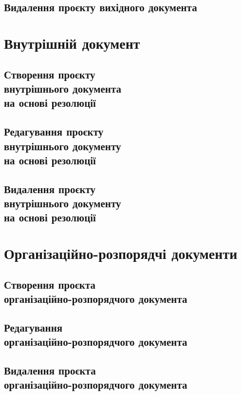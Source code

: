 \subsection{Видалення проєкту вихідного документа}

\section{Внутрішній документ}

\subsection{Створення проєкту \\ внутрішнього документа \\ на основі резолюції}

\subsection{Редагування проєкту \\ внутрішнього документу \\ на основі резолюції}

\subsection{Видалення проєкту \\ внутрішнього документу \\ на основі резолюції}

\section{Організаційно-розпорядчі документи}

\subsection{Створення проєкта \\ організаційно-розпорядчого документа}

\subsection{Редагування \\ організаційно-розпорядчого документа}

\subsection{Видалення проєкта \\ організаційно-розпорядчого документа}

